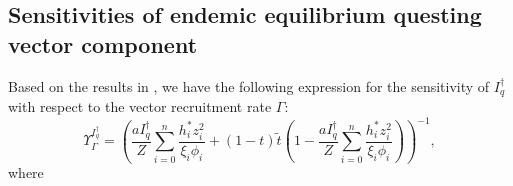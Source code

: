 \documentclass[a4paper]{article}
\newcommand{\ciVar }{\xi_{i} }
\newcommand{\fiVar }{\phi_{i} }
\newcommand{\biVar }{h_{i} }
\newcommand{\varpiVar}{r_{suc}}
\newcommand{\starVar}{\dagger}
\begin{document}

\subsection{Sensitivities of endemic equilibrium questing vector component} 

Based on the results in \cite{jck-19}, we have the following expression for the sensitivity of $I_q^\starVar$ with respect to the vector recruitment rate $\Gamma$:
\begin{equation}\label{eq:sensitivityGamma}
 \varUpsilon_\Gamma^{I_q^\starVar} = \left( \frac{a I_q^\starVar}{Z} \sum_{i=0}^n \frac{\biVar ^* z_i^2}{\ciVar \fiVar  } + 
(1-t) \tilde{t}  \left(1 - \frac{a I_q^\starVar}{Z} \sum_{i=0}^n \frac{\biVar ^* z_i^2}{\ciVar \fiVar  } \right) 
\right)^{-1}, 
\end{equation}
where
\end{document}
